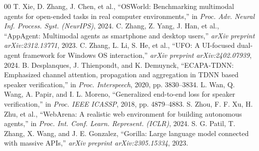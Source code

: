 \documentclass[conference]{IEEEtran}
\begin{document}
\begin{thebibliography}{00}
 T. Xie, D. Zhang, J. Chen, et al., ``OSWorld: Benchmarking multimodal agents for open-ended tasks in real computer environments,'' in \textit{Proc. Adv. Neural Inf. Process. Syst. (NeurIPS)}, 2024.
 C. Zhang, Z. Yang, J. Han, et al., ``AppAgent: Multimodal agents as smartphone and desktop users,'' \textit{arXiv preprint arXiv:2312.13771}, 2023.
 C. Zhang, L. Li, S. He, et al., ``UFO: A UI-focused dual-agent framework for Windows OS interaction,'' \textit{arXiv preprint arXiv:2402.07939}, 2024.
 B. Desplanques, J. Thienpondt, and K. Demuynck, ``ECAPA-TDNN: Emphasized channel attention, propagation and aggregation in TDNN based speaker verification,'' in \textit{Proc. Interspeech}, 2020, pp. 3830--3834.
 L. Wan, Q. Wang, A. Papir, and I. L. Moreno, ``Generalized end-to-end loss for speaker verification,'' in \textit{Proc. IEEE ICASSP}, 2018, pp. 4879--4883.
 S. Zhou, F. F. Xu, H. Zhu, et al., ``WebArena: A realistic web environment for building autonomous agents,'' in \textit{Proc. Int. Conf. Learn. Represent. (ICLR)}, 2024.
 S. G. Patil, T. Zhang, X. Wang, and J. E. Gonzalez, ``Gorilla: Large language model connected with massive APIs,'' \textit{arXiv preprint arXiv:2305.15334}, 2023.
\end{thebibliography}
\end{document}

